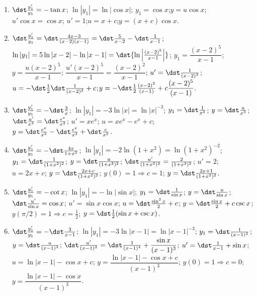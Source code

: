 \documentclass[openany]{book}
\newenvironment{sectionSolutions}{
 \begin{enumerate}[item-label={\thesection.\arabic{enumi}.}]
}{
 \end{enumerate}
}
\begin{document}
\begin{sectionSolutions}
\item
 $\dst\frac{y_1'}{ y_1}=-\tan x$;\quad
$\ln|y_1|=\ln|\cos x|$;\quad
$y_1=\cos x$;\quad $y=u\cos x$;\quad $u'\cos x=\cos x$;\quad
$u'=1$;\quad $u=x+c$;\quad $y=(x+c)\cos x$.


\item
$\dst\frac{y_1'}{ y_1}=\dst\frac{4x-3}{(x-2)(x-1)}=\dst\frac{5}{
x-2}-\dst\frac{1}{ x-1}$;\quad
$\ln|y_1|=5\ln|x-2|-\ln|x-1|=\dst{\ln\left|\frac{(x-2)^5}{
x-1}\right|}$;\quad
$y_1=\dfrac{(x-2)^5}{ x-1}$;\quad
 $y=\dfrac{u(x-2)^5}{ x-1}$;\quad
$\dfrac{u'(x-2)^5}{ x-1}=\dfrac{(x-2)^2}{ x-1}$;\quad
$u'=\dst\frac{1}{ (x-2)^3}$;\quad
$u=-\dst\frac{1}{ 2}\dst\frac{1}{(x-2)^2} +c$;\quad $y=-\dst\frac{1}{
2}\frac{(x-2)^3}{ (x-1)}+c\dfrac{(x-2)^5}{ (x-1)}$.


\item
$\dst\frac{y_1'}{ y_1}=-\dst\frac{3}{ x}$;\quad
$\ln|y_1|=-3\ln|x|=\ln|x|^{-3}$;\quad
$y_1=\dst\frac{1}{ x^3}$;\quad
$y=\dst\frac{u}{ x^3}$;\quad
$\dst\frac{u'}{ x^3}=\dst\frac{e^x}{ x^2}$;\quad
$u'=xe^x$;\quad
$u=xe^x-e^x+c$;\quad
$y=\dst\frac{e^x}{ x^2}-\dst\frac{e^x}{ x^3}+\dst\frac{c}{ x^3}$.



\item
$\dst\frac{y_1'}{ y_1}=-\dst\frac{4x}{1+x^2}$;\quad
$\ln|y_1|=-2\ln(1+x^2)=\ln(1+x^2)^{-2}$;\quad
$y_1=\dst\frac{1}{(1+x^2)^2}$;\quad
$y=\dst\frac{u}{(1+x^2)^2}$;\quad
$\dst\frac{u'}{(1+x^2)^2}=\frac{2}{(1+x^2)^2}$;\quad
$u'=2$;\quad
$u=2x+c$;\quad
$y=\dst\frac{2x+c}{(1+x^2)^2}$;\quad
$y(0)=1\Rightarrow c=1$;\quad
$y=\dst\frac{2x+1}{(1+x^2)^2}$.



\item
$\dst\frac{y_1'}{ y_1}=-\cot x$;\quad
$\ln|y_1|=-\ln|\sin x|$;\quad
$y_1=\dst\frac{1}{\sin x}$;\quad
$y=\dst\frac{u}{\sin x}$;\quad
$\dst\frac{u'}{\sin x}=\cos x$;\quad
$u'=\sin x\cos x$;\quad
$u=\dst\frac{\sin^2x}{2}+c$;\quad
$y=\dst\frac{\sin x}{2}+c\csc x$;\quad
$y(\pi/2)=1\Rightarrow c=\frac{1}{2}$;\quad
$y=\dst\frac{1}{2}(\sin x+\csc x)$.

\item
$\dst\frac{y_1'}{ y_1}=-\dst\frac{3}{ x-1}$;\quad
$\ln|y_1|=-3\ln|x-1|
=\ln|x-1|^{-3}$;\quad
$y_1=\dst\frac{1}{(x-1)^3}$;\quad
$y=\dst\frac{u}{(x-1)^3}$;\quad
$\dst\frac{u'}{(x-1)^3}=
\dst\frac{1}{(x-1)^4}+\dfrac{\sin
x}{(x-1)^3}$;\quad
$u'=\dst\frac{1}{ x-1}+\sin x$;\quad
$u=\ln|x-1|-\cos x+c$;\quad
$y=\dfrac{\ln|x-1|-\cos x+c}{(x-1)^3}$;\quad
$y(0)=1\Rightarrow c=0$;\quad
$y=\dfrac{\ln|x-1|-\cos x}{(x-1)^3}$.



\end{sectionSolutions}
\end{document}
